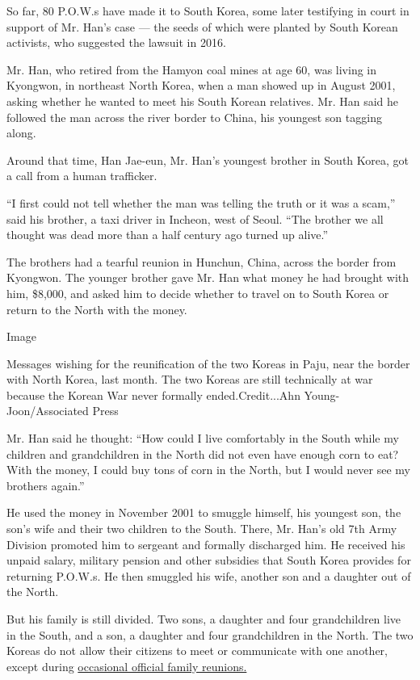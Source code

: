 So far, 80 P.O.W.s have made it to South Korea, some later testifying in
court in support of Mr. Han's case --- the seeds of which were planted
by South Korean activists, who suggested the lawsuit in 2016.

Mr. Han, who retired from the Hamyon coal mines at age 60, was living in
Kyongwon, in northeast North Korea, when a man showed up in August 2001,
asking whether he wanted to meet his South Korean relatives. Mr. Han
said he followed the man across the river border to China, his youngest
son tagging along.

Around that time, Han Jae-eun, Mr. Han's youngest brother in South
Korea, got a call from a human trafficker.

``I ​first ​could not tell whether the man was telling the truth or ​it
was a scam,'' said his brother, a taxi driver in Incheon, west of Seoul.
``The brother we all thought was dead more than a half century ago
turned up alive.''

The brothers had a tearful reunion in Hunchun, China, across the border
​from Kyongwon. The younger brother gave Mr. Han what money he had
brought with him​, \$8,000, ​and asked him to decide whether to travel
​on to South Korea or return to ​the North with the money​.

Image

Messages wishing for the reunification of the two Koreas in Paju, near
the border with North Korea, last month. The two Koreas are still
technically at war because the Korean War never formally
ended.Credit...Ahn Young-Joon/Associated Press

Mr. Han said he thought: ``How ​could I live comfortably in the South
while my children and grandchildren​ in the North​ did not even have
enough corn to eat? With the money, I could buy tons of corn in the
North​, but I would never see my brothers again.''

He used the money in November 2001 to smuggle himself, his youngest son,
the son's wife and their two children to the South. There, Mr. Han's old
7th Army Division promoted him to sergeant and formally discharged him.
He ​received his unpaid salary, military pension and other subsidies
that South Korea provides for returning P.O.W.s. He then smuggled his
wife, another son and a daughter ​out of the North.

But his family is still divided. Two sons, a daughter and four
grandchildren live in the South, and a son, a daughter and four
grandchildren in the North. The two Koreas do not allow their citizens
to meet or communicate with one another​, except during
\href{https://www.nytimes.com/2015/10/21/world/asia/south-and-north-koreans-separated-almost-a-lifetime-reunite-briefly.html}{occasional
official family reunions.}

